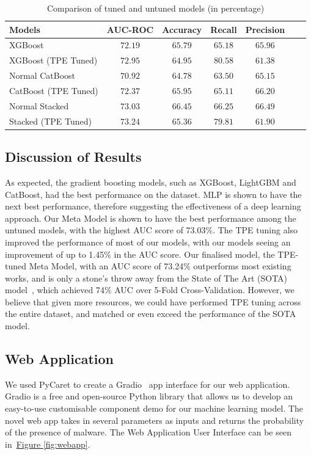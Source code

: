 \documentclass[pdflatex,sn-basic,Numbered]{sn-jnl}%
\theoremstyle{thmstyleone}%
\theoremstyle{thmstyletwo}%
\theoremstyle{thmstylethree}%
\newcommand{\reffig}[1]{\hyperref[#1]{Figure \ref*{#1}}}
\begin{document}
\begin{table}
\centering
\caption{Comparison of tuned and untuned models (in percentage)}
\label{tab:hypertuning}
\begin{tabular}{@{}lcccccc@{}}
\toprule
 \textbf{Models} & \textbf{AUC-ROC} & \textbf{Accuracy} & \textbf{Recall}  & \textbf{Precision} \\ \midrule
XGBoost & $72.19$ & $65.79$ & $65.18$ & $65.96$ \\ %
 XGBoost (TPE Tuned) & $72.95$ & $64.95$ & $\mathbf{80.58}$ & $61.38$ \\ \hline
Normal CatBoost & $70.92$ & $64.78$ & $63.50$ & $65.15$ \\ %
 CatBoost (TPE Tuned) & $72.37$ & $65.95$ & $65.11$ & $66.20$ \\ \hline
 Normal Stacked & $73.03$ & $\mathbf{66.45}$ & $66.25$ & $\mathbf{66.49}$ \\ %
 Stacked (TPE Tuned) & $\mathbf{73.24}$ & $65.36$ & $79.81$ & $61.90$ \\ \bottomrule %
\end{tabular}%
\vspace{-2ex}
\end{table}


\subsection{Discussion of Results}\label{subsec:discussion-of-results}
As expected, the gradient boosting models, such as XGBoost, LightGBM and CatBoost, had the best performance on the dataset.
MLP is shown to have the next best performance, therefore suggesting the effectiveness of a deep learning approach.
Our Meta Model is shown to have the best performance among the untuned models, with the highest AUC score of 73.03\%.
The TPE tuning also improved the performance of most of our models, with our models seeing an improvement of up to 1.45\% in the AUC score.
Our finalised model, the TPE-tuned Meta Model, with an AUC score of 73.24\% outperforms most existing works, and is only a stone's throw away from the State of The Art (SOTA) model~\cite{shahini2019}, which achieved 74\% AUC over 5-Fold Cross-Validation.
However, we believe that given more resources, we could have performed TPE tuning across the entire dataset, and matched or even exceed the performance of the SOTA model.

\subsection{Web Application}\label{subsec:web-application}
We used PyCaret to create a Gradio~\cite{gradio} app interface for our web application.
Gradio is a free and open-source Python library that allows us to develop an easy-to-use customisable component demo for our machine learning model.
The novel web app takes in several parameters as inputs and returns the probability of the presence of malware.
The Web Application User Interface can be seen in~\reffig{fig:webapp}.
\end{document}
